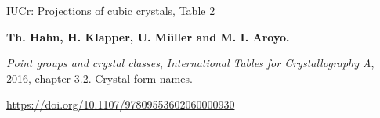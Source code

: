 \href{https://www.iucr.org/what-we-do/education/pamphlets/projections-of-cubic-crystals}{IUCr: Projections of cubic crystals, Table 2}
\par\medskip\noindent\textbf{Th. Hahn, H. Klapper, U. Müller and M. I. Aroyo.}\par\nobreak\smallskip\noindent \emph{Point groups and crystal classes}, \emph{International Tables for Crystallography A}, 2016, chapter 3.2. Crystal-form names.\par
\url{https://doi.org/10.1107/97809553602060000930}



\clearpage\endgroup\clearpage
\setcounter{page}{\the\SavedTranslationPage}
\hypersetup{pageanchor=true}
